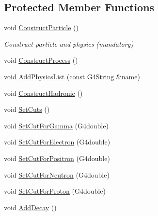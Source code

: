 \subsection*{Protected Member Functions}
\begin{DoxyCompactItemize}
\item 
void \hyperlink{classUMPhysicsList_a3d9f5a9dae553a1d474e8f22860a1ba3}{Construct\+Particle} ()
\begin{DoxyCompactList}\small\item\em Construct particle and physics (mandatory) \end{DoxyCompactList}\item 
void \hyperlink{classUMPhysicsList_a12757c54b86f49f82f9361467f0dcab1}{Construct\+Process} ()
\item 
void \hyperlink{classUMPhysicsList_a4fa74e9c6ebb36baeb975eff3d46af78}{Add\+Physics\+List} (const G4\+String \&name)
\item 
void \hyperlink{classUMPhysicsList_afb0c2f5e798769d9311d94ef25ac4196}{Construct\+Hadronic} ()
\item 
void \hyperlink{classUMPhysicsList_a53bfbb22fa66112d17dd5145a6567b95}{Set\+Cuts} ()
\item 
void \hyperlink{classUMPhysicsList_ab0b676bdb215ef0f4d33870692e9c932}{Set\+Cut\+For\+Gamma} (G4double)
\item 
void \hyperlink{classUMPhysicsList_aa910cc54caf73cb121ba3101079404df}{Set\+Cut\+For\+Electron} (G4double)
\item 
void \hyperlink{classUMPhysicsList_a241f9a0966e58591c2670b84127effa9}{Set\+Cut\+For\+Positron} (G4double)
\item 
void \hyperlink{classUMPhysicsList_abd53a8065177046859b5667e52fe88a9}{Set\+Cut\+For\+Neutron} (G4double)
\item 
void \hyperlink{classUMPhysicsList_ac44692e5e078e015f1bef67525791a5b}{Set\+Cut\+For\+Proton} (G4double)
\item 
void \hyperlink{classUMPhysicsList_ab66c1fa0a2b203bda573e40c63ca46ae}{Add\+Decay} ()
\end{DoxyCompactItemize}
